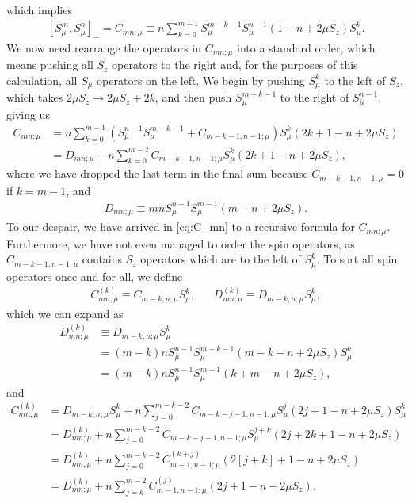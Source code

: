 \documentclass[aps,notitlepage,nofootinbib,11pt]{revtex4-1}
\newcommand{\p}[1]{\left(#1\right)} %
\renewcommand{\sp}[1]{\left[#1\right]} %
\newcommand{\bmu}{{\bar\mu}}
\newcommand{\1}{\mathds{1}}
\begin{document}
which implies
\begin{align}
  \sp{S_\mu^m, S_\bmu^n}_-
  = C_{mn;\mu}
  \equiv n \sum_{k=0}^{m-1} S_\mu^{m-k-1} S_\bmu^{n-1}
  \p{1 - n + 2\mu S_z} S_\mu^k.
\end{align}
We now need rearrange the operators in $C_{mn;\mu}$ into a standard
order, which means pushing all $S_z$ operators to the right and, for
the purposes of this calculation, all $S_\bmu$ operators on the left.
We begin by pushing $S_\mu^k$ to the left of $S_z$, which takes
$2\mu S_z\to 2\mu S_z+2k$, and then push $S_\mu^{m-k-1}$ to the right
of $S_\bmu^{n-1}$, giving us
\begin{align}
  C_{mn;\mu}
  &= n \sum_{k=0}^{m-1}
  \p{S_\bmu^{n-1} S_\mu^{m-k-1} + C_{m-k-1,n-1;\mu}} S_\mu^k
  \p{2k + 1 - n + 2\mu S_z} \\
  &= D_{mn;\mu}
  + n \sum_{k=0}^{m-2} C_{m-k-1,n-1;\mu}
  S_\mu^k \p{2k + 1 - n + 2\mu S_z},
  \label{eq:C_mn}
\end{align}
where we have dropped the last term in the final sum because
$C_{m-k-1,n-1;\mu}=0$ if $k=m-1$, and
\begin{align}
  D_{mn;\mu}
  \equiv mn S_\bmu^{n-1} S_\mu^{m-1} \p{m - n + 2\mu S_z}.
  \label{eq:D_mn}
\end{align}
To our despair, we have arrived in \eqref{eq:C_mn} to a recursive
formula for $C_{mn;\mu}$.  Furthermore, we have not even managed to
order the spin operators, as $C_{m-k-1,n-1;\mu}$ contains $S_z$
operators which are to the left of $S_\mu^k$.  To sort all spin
operators once and for all, we define
\begin{align}
  C_{mn;\mu}^{(k)} \equiv C_{m-k,n;\mu} S_\mu^k,
  &&
  D_{mn;\mu}^{(k)} \equiv D_{m-k,n;\mu} S_\mu^k,
\end{align}
which we can expand as
\begin{align}
  D_{mn;\mu}^{(k)}
  &\equiv D_{m-k,n;\mu}S_\mu^k \\
  &= \p{m-k}n S_\bmu^{n-1} S_\mu^{m-k-1}
  \p{m-k-n+2\mu S_z} S_\mu^k \\
  &= \p{m-k}n S_\bmu^{n-1} S_\mu^{m-1} \p{k+m-n+2\mu S_z},
  \label{eq:D_mn_k}
\end{align}
and
\begin{align}
  C_{mn;\mu}^{(k)}
  &= D_{m-k,n;\mu} S_\mu^k + n \sum_{j=0}^{m-k-2}
  C_{m-k-j-1,n-1;\mu} S_\mu^j \p{2j+1-n+2\mu S_z} S_\mu^k \\
  &= D_{mn;\mu}^{(k)} + n \sum_{j=0}^{m-k-2}
  C_{m-k-j-1,n-1;\mu} S_\mu^{j+k} \p{2j+2k+1-n+2\mu S_z} \\
  &= D_{mn;\mu}^{(k)} + n \sum_{j=0}^{m-k-2}
  C_{m-1,n-1;\mu}^{(k+j)} \p{2\sp{j+k}+1-n+2\mu S_z} \\
  &= D_{mn;\mu}^{(k)} + n \sum_{j=k}^{m-2}
  C_{m-1,n-1;\mu}^{(j)} \p{2j+1-n+2\mu S_z}.
  \label{eq:C_mn_k}
\end{align}
\end{document}
